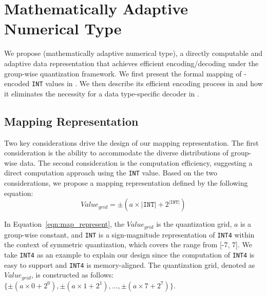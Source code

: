 
\section{Mathematically Adaptive Numerical Type}
\label{sec:encode}





We propose \proj (mathematically adaptive numerical type), a directly computable and adaptive data representation that achieves efficient encoding/decoding under the group-wise quantization framework.
We first present the formal mapping of \proj{}-encoded \texttt{INT} values in .
We then describe its efficient encoding process in  and how it eliminates the necessity for a data type-specific decoder in .


\subsection{Mapping Representation}
\label{sec:encode_mapping}



Two key considerations drive the design of our mapping representation.
The first consideration is the ability to accommodate the diverse distributions of group-wise data.
The second consideration is the computation efficiency, suggesting a direct computation approach using the \texttt{INT} value.
Based on the two considerations, we propose a mapping representation defined by the following equation:
\begin{equation}	
    Value_{grid} = \pm (a \times |\texttt{INT}| + 2^{|\texttt{INT}|})
    \label{eqn:map_represent}
\end{equation}

In Equation~\eqref{eqn:map_represent}, the $Value_{grid}$ is the quantization grid, $a$ is a group-wise constant, and \texttt{INT} is a sign-magnitude representation of \texttt{INT4} within the context of symmetric quantization, which covers the range from [-7, 7].
We take \texttt{INT4} as an example to explain our design since the computation of \texttt{INT4} is easy to support and \texttt{INT4} is memory-aligned.
The quantization grid, denoted as $Value_{grid}$, is constructed as follows: $\{\pm (a \times 0 + 2^{0}), \pm (a \times 1 + 2^1),..., \pm (a \times 7 + 2^7) \}$.

